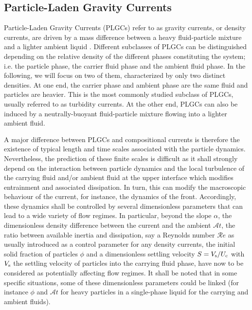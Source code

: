 \documentclass[12pt]{article}
\begin{document}
\subsection{Particle-Laden Gravity Currents}
\label{sec:intro_PLGC}

Particle-Laden Gravity Currents (PLGCs) refer to as gravity currents, or density currents, are driven by a mass difference between a heavy fluid-particle mixture and a lighter ambient liquid \citep[e.g.][]{Hopfinger1983,Middleton1993,Kneller2000,Meiburg2010,wells2021}. Different subclasses of PLGCs can be distinguished depending on the relative density of the different phases constituting the system; i.e. the particle phase, the carrier fluid phase and the ambient fluid phase. In the following, we will focus on two of them, characterized by only two distinct densities. At one end, the carrier phase and ambient phase are the same fluid and particles are heavier. This is the most commonly studied subclass of PLGCs, usually referred to as turbidity currents. At the other end, PLGCs can also be induced by a neutrally-buoyant fluid-particle mixture flowing into a lighter ambient fluid.

A major difference between PLGCs and compositional currents is therefore the existence of typical length and time scales associated with the particle dynamics. Nevertheless, the prediction of these finite scales is difficult as it shall strongly depend on the interaction between particle dynamics and the local turbulence of the carrying fluid and/or ambient fluid at the upper interface which modifies entrainment and associated dissipation. In turn, this can modify the macroscopic behaviour of the current, for instance, the dynamics of the front. Accordingly, these dynamics shall be controlled by several dimensionless parameters that can lead to a wide variety of flow regimes. In particular, beyond the slope $\alpha$, the dimensionless density difference between the current and the ambient $\mathcal{A}t$, the ratio between available inertia and dissipation, say a Reynolds number $\mathcal{R}e$ as usually introduced as a control parameter for any density currents, the initial solid fraction of particles $\phi$ and a dimensionless settling velocity $S=V_{\text s}/U_{\text{c}}$ with $V_{\text s}$ the settling velocity of particles into the carrying fluid phase, have now to be considered as potentially affecting flow regimes. It shall be noted that in some specific situations, some of these dimensionless parameters could be linked (for instance $\phi$ and $\mathcal{A}t$ for heavy particles in a single-phase liquid for the carrying and ambient fluids).
\end{document}
